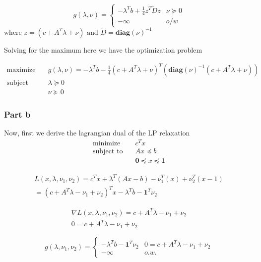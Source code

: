 \begin{equation}
  g(\lambda, \nu) = 
  \begin{cases}
    -\lambda^T b + \frac{1}{4} z^T \tilde{D} z & \nu \succeq 0 \\
    -\infty & o/w
  \end{cases}
\end{equation}
where $z = (c + A^T \lambda + \nu) \text{ and } \tilde{D} = \textbf{diag}(\nu) ^{-1}$

Solving for the maximum here we have the optimization problem

\begin{align}
  \text{maximize} & \quad g(\lambda, \nu) = -\lambda^T b - \frac{1}{4} (c + A^T \lambda + \nu)^T (\textbf{diag}(\nu) ^{-1} (c + A^T \lambda + \nu ))  \\
  \text{subject to} & \quad \lambda \succeq 0 \\
  & \quad \nu \succeq 0 
\end{align}

\subsubsection{Part b}
Now, first we derive the lagrangian dual of the LP relaxation 
\begin{align}
  \text{minimize} & \quad c^T x \\
  \text{subject to} & \quad Ax \preceq b \\
  & \quad \textbf{0} \preceq x \preceq \textbf{1}
\end{align}

\begin{equation}
  \begin{aligned}
    L(x, \lambda, \nu_1, \nu_2) = c^T x + \lambda^T (Ax-b) - \nu_1^T (x) + \nu_2^T (x-1) \\
    = (c+ A^T \lambda -\nu_1 + \nu_2 )^T x - \lambda^T b - \textbf{1}^T \nu_2
  \end{aligned}
\end{equation}

\begin{equation}
  \begin{aligned}
    \nabla L(x, \lambda, \nu_1, \nu_2) = c + A^T \lambda - \nu_1 + \nu_2 \\
    0 =  c + A^T \lambda - \nu_1 + \nu_2
  \end{aligned}
\end{equation}

\begin{equation}
  g(\lambda, \nu_1, \nu_2) = 
  \begin{cases}
    -\lambda^T b - \textbf{1}^T \nu_2 & 0 =  c + A^T \lambda - \nu_1 + \nu_2 \\
    -\infty & o.w.
  \end{cases}
\end{equation}

